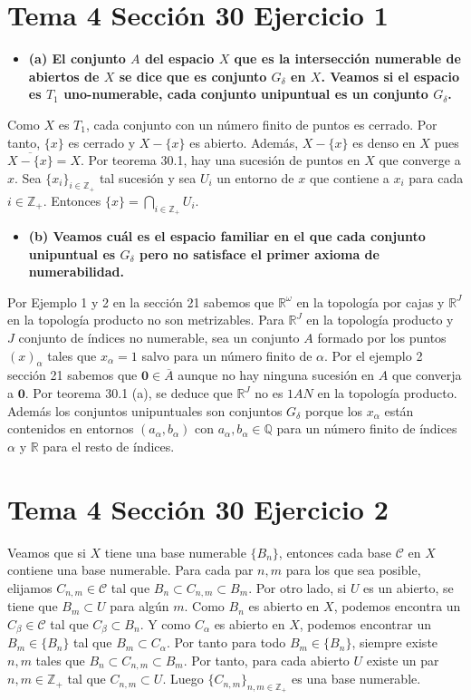 \documentclass{article}
\newcommand{\vect}[1]{\boldsymbol{#1}}
\begin{document}
\section{Tema 4 Sección 30 Ejercicio 1}
\begin{itemize}
\item \bf (a) \rm El conjunto $A$ del espacio $X$ que es la intersección numerable de abiertos  de $X$ se dice que es conjunto $G_\delta$ en $X$. Veamos si el espacio es $T_1$ uno-numerable, cada conjunto unipuntual es un conjunto $G_\delta$.
\end{itemize}
Como $X$ es $T_1$, cada conjunto con un número finito de puntos es cerrado. Por tanto, $\{x\}$ es cerrado y $X-\{x\}$ es abierto. Además, $X-\{x\}$ es denso en $X$ pues $\overline{X-\{x\}}=X$. Por teorema 30.1, hay una sucesión de puntos en $X$ que converge a $x$. Sea $\{x_i\}_{i\in\mathbb{Z}_+}$ tal sucesión y sea $U_i$ un entorno de $x$ que contiene a $x_i$ para cada $i\in\mathbb{Z}_+$. Entonces $\{x\}=\bigcap_{i\in \mathbb{Z}_+}U_i$.
\begin{itemize}
\item \bf (b) \rm Veamos cuál es el espacio familiar en el que cada conjunto unipuntual es $G_\delta$ pero no satisface el primer axioma de numerabilidad. 
\end{itemize}
Por Ejemplo 1 y 2 en la sección 21 sabemos que $\mathbb{R}^\omega$ en la topología por cajas y $\mathbb{R}^J$ en la topología producto no son metrizables. Para $\mathbb{R}^J$ en la topología producto y $J$ conjunto de índices no numerable, sea un conjunto $A$ formado por los puntos $(x)_\alpha$ tales que $x_\alpha=1$ salvo para un número finito de $\alpha$. Por el ejemplo 2 sección 21 sabemos que $\vect{0}\in \overline{A}$ aunque no hay ninguna sucesión en $A$ que converja a $\vect{0}$. Por teorema 30.1 (a), se deduce que $\mathbb{R}^J$ no es $1AN$ en la topología producto. Además los conjuntos unipuntuales son conjuntos $G_\delta$ porque los $x_\alpha$ están contenidos en entornos $(a_\alpha,b_\alpha)$ con $a_\alpha,b_\alpha\in \mathbb{Q}$ para un número finito de índices $\alpha$ y $\mathbb{R}$ para el resto de índices.
\section{Tema 4 Sección 30 Ejercicio 2}
Veamos que si $X$ tiene una base numerable $\{B_n\}$, entonces cada base $\mathcal{C}$ en $X$ contiene una base numerable. Para cada par $n,m$ para los que sea posible, elijamos $C_{n,m}\in \mathcal{C}$ tal que $B_n\subset C_{n,m}\subset B_m$. Por otro lado, si $U$ es un abierto, se tiene que $B_m\subset U$ para algún $m$. Como $B_n$ es abierto en $X$, podemos encontra un $C_\beta\in \mathcal{C}$ tal que $C_\beta\subset B_n$. Y como $C_\alpha$ es abierto en $X$, podemos encontrar un $B_m\in \{B_n\}$ tal que $B_m\subset C_\alpha$. Por tanto para todo $B_m\in \{B_n\}$, siempre existe $n,m$ tales que $B_n\subset C_{n,m}\subset B_m$. Por tanto, para cada abierto $U$ existe un par $n,m\in\mathbb{Z}_+$ tal que $C_{n,m}\subset U$. Luego $\{C_{n,m}\}_{n,m\in\mathbb{Z}_+}$ es una base numerable.
\end{document}
